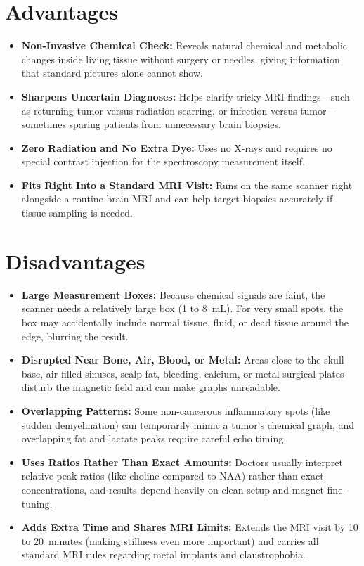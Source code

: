 \section{Advantages}
\begin{itemize}
\item \textbf{Non-Invasive Chemical Check:} Reveals natural chemical and metabolic changes inside living tissue without surgery or needles, giving information that standard pictures alone cannot show.
\item \textbf{Sharpens Uncertain Diagnoses:} Helps clarify tricky MRI findings---such as returning tumor versus radiation scarring, or infection versus tumor---sometimes sparing patients from unnecessary brain biopsies.
\item \textbf{Zero Radiation and No Extra Dye:} Uses no X-rays and requires no special contrast injection for the spectroscopy measurement itself.
\item \textbf{Fits Right Into a Standard MRI Visit:} Runs on the same scanner right alongside a routine brain MRI and can help target biopsies accurately if tissue sampling is needed.
\end{itemize}

\section{Disadvantages}
\begin{itemize}
\item \textbf{Large Measurement Boxes:} Because chemical signals are faint, the scanner needs a relatively large box (1 to 8~mL). For very small spots, the box may accidentally include normal tissue, fluid, or dead tissue around the edge, blurring the result.
\item \textbf{Disrupted Near Bone, Air, Blood, or Metal:} Areas close to the skull base, air-filled sinuses, scalp fat, bleeding, calcium, or metal surgical plates disturb the magnetic field and can make graphs unreadable.
\item \textbf{Overlapping Patterns:} Some non-cancerous inflammatory spots (like sudden demyelination) can temporarily mimic a tumor's chemical graph, and overlapping fat and lactate peaks require careful echo timing.
\item \textbf{Uses Ratios Rather Than Exact Amounts:} Doctors usually interpret relative peak ratios (like choline compared to NAA) rather than exact concentrations, and results depend heavily on clean setup and magnet fine-tuning.
\item \textbf{Adds Extra Time and Shares MRI Limits:} Extends the MRI visit by 10 to 20~minutes (making stillness even more important) and carries all standard MRI rules regarding metal implants and claustrophobia.
\end{itemize}

